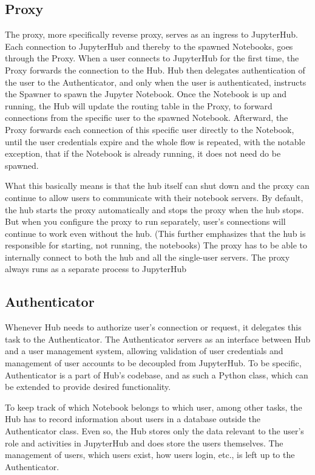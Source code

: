 \documentclass[
  digital,     %
  oneside,     %
  nosansbold,  %
  nocolorbold, %
  lof,         %
  lot,         %
]{fithesis4}
\begin{document}
\subsection{Proxy}
The proxy, more specifically reverse proxy, serves as an ingress to JupyterHub. Each connection to JupyterHub and thereby to the spawned Notebooks, goes through the Proxy. 
When a user connects to JupyterHub for the first time, the Proxy forwards the connection to the Hub. Hub then delegates authentication of the user to the Authenticator, and only when the user is authenticated, instructs the Spawner to spawn the Jupyter Notebook. Once the Notebook is up and running, the Hub will update the routing table in the Proxy, to forward connections from the specific user to the spawned Notebook. Afterward, the Proxy forwards each connection of this specific user directly to the Notebook, until the user credentials expire and the whole flow is repeated, with the notable exception, that if the Notebook is already running, it does not need do be spawned.

What this basically means is that the hub itself can shut down and the proxy can continue to allow users to communicate with their notebook servers.
By default, the hub starts the proxy automatically and stops the proxy when the hub stops.
But when you configure the proxy to run separately, user’s connections will continue to work even without the hub.
(This further emphasizes that the hub is responsible for starting, not running, the notebooks)
The proxy has to be able to internally connect to both the hub and all the single-user servers.
The proxy always runs as a separate process to JupyterHub

\subsection{Authenticator}
Whenever Hub needs to authorize user's connection or request, it delegates this task to the Authenticator. The Authenticator servers as an interface between Hub and a user management system, allowing validation of user credentials and management of user accounts to be decoupled from JupyterHub. To be specific, Authenticator is a part of Hub's codebase, and as such a Python class, which can be extended to provide desired functionality.

To keep track of which Notebook belongs to which user, among other tasks, the Hub has to record information about users in a database outside the Authenticator class. Even so, the Hub stores only the data relevant to the user's role and activities in JupyterHub and does store the users themselves. The management of users, which users exist, how users login, etc., is left up to the Authenticator.
\end{document}
